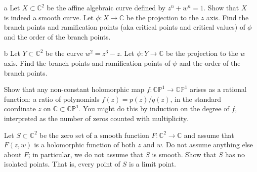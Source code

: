 \documentclass{pset}
\begin{document}
\begin{parts}
  \begin{part}{a}
  Let $X \subset \mathbb{C}^2$ be the affine algebraic curve defined by $z^n + w^n = 1$. Show that $X$ is indeed a smooth curve. Let $\phi : X \rightarrow \mathbb{C}$ be the projection to the $z$ axis. Find the branch points and ramification points (aka critical points and critical values) of $ \phi $ and the order of the branch points.
  \end{part}

  \begin{part}{b}
  Let $ Y \subset \mathbb{C}^2 $ be the curve $ w^2 = z^3 - z $. Let $ \psi : Y \rightarrow \mathbb{C} $ be the projection to the $ w $ axis. Find the branch points and ramification points of $ \psi $ and the order of the branch points.
  \end{part}
\end{parts}

\begin{problem}{4}
Show that any non-constant holomorphic map $ f : \mathbb{CP}^1 \rightarrow \mathbb{CP}^1 $ arises as a rational function: a ratio of polynomials $ f(z) = p(z)/q(z) $, in the standard coordinate $ z $ on $ \mathbb{C} \subset \mathbb{CP}^1 $. You might do this by induction on the degree of $ f $, interpreted as the number of zeros counted with multiplicity.
\end{problem}

\begin{solution}
\end{solution}

\begin{problem}{5}
Let $ S \subset \mathbb{C}^2 $ be the zero set of a smooth function $ F : \mathbb{C}^2 \rightarrow \mathbb{C} $ and assume that $ F(z, w) $ is a holomorphic function of both $ z $ and $ w $. Do not assume anything else about $ F $; in particular, we do not assume that $ S $ is smooth. Show that $ S $ has no isolated points. That is, every point of $ S $ is a limit point.
\end{problem}

\begin{solution}
\end{solution}
\end{document}
